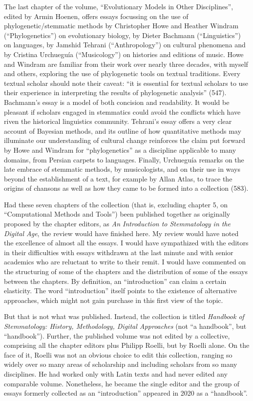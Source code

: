 \begin{review}
\newpage

\noindent The last chapter of the volume, ``Evolutionary Models in Other
Disciplines'', edited by Armin Hoenen, offers essays focussing on the
use of phylogenetic/stemmatic methods by Christopher Howe and Heather
Windram (``Phylogenetics'') on evolutionary biology, by Dieter Bachmann
(``Linguistics'') on languages, by Jamshid Tehrani (``Anthropology'') on
cultural phenomena and by Cristina Urchueguía (``Musicology'') on
histories and editions of music. Howe and Windram are familiar from
their work over nearly three decades, with myself and others, exploring
the use of phylogenetic tools on textual traditions. Every textual
scholar should note their caveat: ``it is essential for textual scholars
to use their experience in interpreting the results of phylogenetic
analysis'' (547). Bachmann's essay is a model of both concision and
readability. It would be pleasant if scholars engaged in stemmatics
could avoid the conflicts which have riven the historical linguistics
community. Tehrani's essay offers a very clear account of Bayesian
methods, and its outline of how quantitative methods may illuminate our
understanding of cultural change reinforces the claim put forward by
Howe and Windram for ``phylogenetics'' as a discipline applicable to
many domains, from Persian carpets to languages. Finally, Urchueguía
remarks on the late embrace of stemmatic methods, by musicologists, and
on their use in ways beyond the establishment of a text, for example by
Allan Atlas, to trace the origins of chansons as well as how they came
to be formed into a collection (583).

Had these seven chapters of the collection (that is, excluding
chapter 5, on ``Computational Methods and Tools'') been published
together as originally proposed by the chapter editors, as \emph{An
Introduction to Stemmatology in the Digital Age}, the review would have
finished here. My review would have noted the excellence of almost all
the essays. I would have sympathized with the editors in their
difficulties with essays withdrawn at the last minute and with senior
academics who are reluctant to write to their remit. I would have
commented on the structuring of some of the chapters and the
distribution of some of the essays between the chapters. By definition,
an ``introduction'' can claim a certain elasticity. The word
``introduction'' itself points to the existence of alternative
approaches, which might not gain purchase in this first view of the
topic.

But that is not what was published. Instead, the collection is
titled \emph{Handbook of Stemmatology: History, Methodology, Digital
Approaches} (not ``a handbook'', but ``handbook''). Further, the
published volume was not edited by a collective, comprising all the
chapter editors plus Philipp Roelli, but by Roelli alone. On the face
of it, Roelli was not an obvious choice to edit this collection, ranging
so widely over so many areas of scholarship and including scholars from
so many disciplines. He had worked only with Latin texts and had never
edited any comparable volume. Nonetheless, he became the single editor
and the group of essays formerly collected as an ``introduction''
appeared in 2020 as a ``handbook''.


\end{review}
